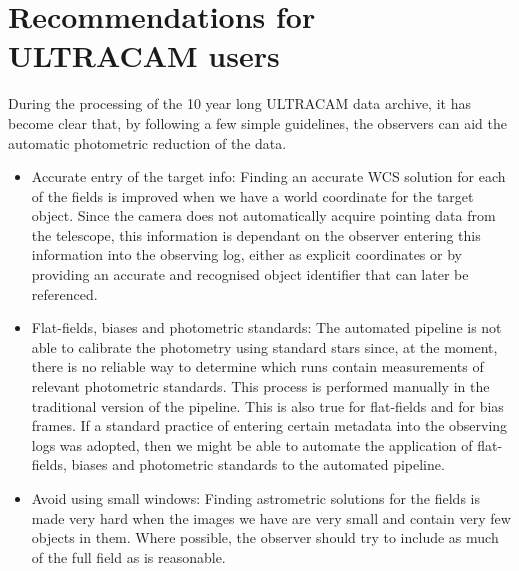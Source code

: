 \section{Recommendations for ULTRACAM users}
During the processing of the 10 year long ULTRACAM data archive, it has become clear that, by following a few simple guidelines, the observers can aid the automatic photometric reduction of the data. 

\begin{itemize}
	\item{Accurate entry of the target info}: Finding an accurate WCS solution for each of the fields is improved when we have a world coordinate for the target object. Since the camera does not automatically acquire pointing data from the telescope, this information is dependant on the observer entering this information into the observing log, either as explicit coordinates or by providing an accurate and recognised object identifier that can later be referenced. 
	\item{Flat-fields, biases and photometric standards}: The automated pipeline is not able to calibrate the photometry using standard stars since, at the moment, there is no reliable way to determine which runs contain measurements of relevant photometric standards. This process is performed manually in the traditional version of the pipeline. This is also true for flat-fields and for bias frames. If a standard practice of entering certain metadata into the observing logs was adopted, then we might be able to automate the application of flat-fields, biases and photometric standards to the automated pipeline. 
	\item{Avoid using small windows}: Finding astrometric solutions for the fields is made very hard when the images we have are very small and contain very few objects in them. Where possible, the observer should try to include as much of the full field as is reasonable. 
\end{itemize} 
